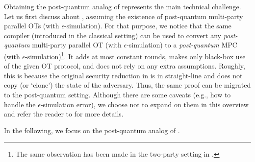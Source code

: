 Obtaining the post-quantum analog of  represents the main technical challenge. Let us first discuss about , assuming the existence of post-quantum multi-party parallel OTs (with $\epsilon$-simulation). For that purpose, we notice that the same \cite{C:IshPraSah08} compiler (introduced in the classical setting) can be used to convert any {\em post-quantum} multi-party parallel OT (with $\epsilon$-simulation) to a {\em post-quantum} MPC (with $\epsilon$-simulation)\footnote{The same observation has been made in the two-party setting in \cite{C:CCLY22}.}. It adds at most constant rounds, makes only black-box use of the given OT protocol, and does not rely on any extra assumptions. Roughly, this is because the original security reduction in \cite{C:IshPraSah08} is in straight-line and does not copy (or `clone') the state of the adversary. Thus, the same proof can be migrated to the post-quantum setting. Although there are some caveats (e.g., how to handle the $\epsilon$-simulation error), we choose not to expand on them in this overview and refer the reader to  for more details.

In the following, we focus on the post-quantum analog of .

